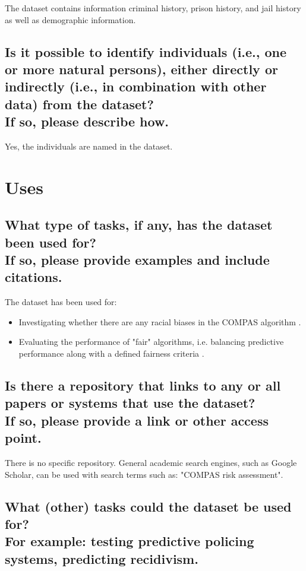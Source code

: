 \documentclass[letterpaper, 10 pt, conference]{ieeeconf}  %
\newcommand{\subtitle}[1]{{\\ \small \normalfont \color{purple} #1}}
\begin{document}
The dataset contains information criminal history, prison history, and jail history as well as demographic information. 

\subsection{Is it possible to identify individuals (i.e., one or more natural persons), either directly or indirectly (i.e., in combination with other data) from the dataset? \subtitle{If so, please describe how.}}

Yes, the individuals are named in the dataset.

\section{Uses}

\subsection{What type of tasks, if any, has the dataset been used for? \subtitle{If so, please provide examples and include citations.}}

The dataset has been used for:

\begin{itemize}
    \item Investigating whether there are any racial biases in the COMPAS algorithm \cite{Rudin2020Age, hamilton2019biased}.
    \item Evaluating the performance of "fair" algorithms, i.e. balancing predictive performance along with a defined fairness criteria \cite{wadsworth2018achieving}.
\end{itemize}

\subsection{Is there a repository that links to any or all papers or systems that use the dataset? \subtitle{If so, please provide a link or other access point. }}

There is no specific repository. General academic search engines, such as Google Scholar, can be used with search terms such as: "COMPAS risk assessment".

\subsection{What (other) tasks could the dataset be used for? \subtitle{For example: testing predictive policing systems, predicting recidivism.}}
\end{document}
